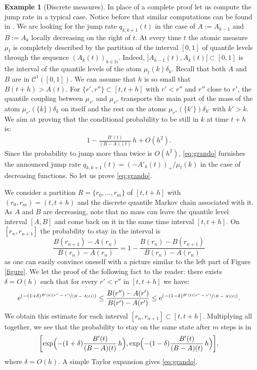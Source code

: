 \documentclass[11pt]{article}
\theoremstyle{plain}
\theoremstyle{definition}
\newtheorem{ex}[them]{Example}
\newcommand{\N}{\mathbb{N}}
\newcommand{\e}{\mathrm{e}}
\begin{document}
\begin{ex}[Discrete measures]
In place of a complete proof let us compute the jump rate in a typical case. Notice before that similar computations can be found in \cite[\S 4]{Ju_ejp}. We are looking for the jump rate $q_{k,k+1}(t)$ in the case of $A:=A_{k-1}$ and $B:=A_k$ locally decreasing on the right of $t$. At every time $t$ the atomic measure $\mu_t$ is completely described by the partition of the interval $[0,1]$ of quantile levels through the sequence $(A_k(t))_{k\in \N}$. Indeed, $]A_{k-1}(t),A_k(t)[\subset [0,1]$ is the interval
of the quantile levels of the atom $\mu_t(k)\delta_k$. Recall that both $A$ and $B$ are in $\mathcal{C}^1([0,1])$. We can assume that $h$ is so small that $B(t+h)>A(t)$. For $\{r',r''\}\subset[t,t+h]$ with $r'<r''$ and $r''$ close to $r'$, the quantile coupling between $\mu_{r'}$ and $\mu_{r''}$ transports the main part of the mass of the atom $\mu_{r'}(\{k\})\delta_k$ on itself and the rest on the atoms $\mu_{r''}(\{k'\})\delta_{k'}$ with $k'>k$. We aim at proving that the conditional probability to be still in $k$ at time $t+h$ is:\vspace*{-3pt}
\begin{align}\label{eq:grando}
1-\frac{B'(t)}{(B-A)(t)}\,h+O(h^2).
\end{align}
Since the probability to jump more than twice is $O(h^2)$, \eqref{eq:grando} furnishes the announced jump rate $q_{k,k+1}(t)=(-A'_k(t))_+/\mu_t(k)$ in the case of decreasing functions. So let us prove \eqref{eq:grando}.

We consider a partition $R=\{r_0,\ldots,r_{m}\}$ of $[t,t+h]$ with $(r_0,r_{m})=(t,t+h)$ and the discrete quantile Markov chain associated with it. As $A$ and $B$ are decreasing, note that no mass can leave the quantile level interval $[A,B]$ and come back on it in the same time interval $[t,t+h]$. On $[r_n,r_{n+1}]$ the probability to stay in the interval is
\[
\frac{B(r_{n+1})-A(r_n)}{B(r_n)-A(r_n)}=1-\frac{B(r_n)-B(r_{n+1})}{B(r_n)-A(r_n)}
\]
as one can easily convince oneself with a picture similar to the left part of Figure \ref{figure}. We let the proof of the following fact to the reader: there exists $\delta=O(h)$ such that for every $r'<r''$ in $[t,t+h]$ we have:
\[\e^{\left(-(1+\delta)\sfrac{B'(t)(r''-r')}{(B-A)(t)}\right)}\leq \frac{B(r'')-A(r')}{B(r')-A(r')}\leq \e^{\left(-(1-\delta)\sfrac{B'(t)(r''-r')}{(B-A)(t)}\right)}.\]
We obtain this estimate for each interval $[r_n,r_{n+1}]\subset [t,t+h]$. Multiplying all together, we see that the probability to stay on the same state after $m$ steps is in
\[
\biggl[\exp\Bigl(-(1+\delta)\frac{B'(t)}{(B-A)(t)}\,h \Bigr),\exp\Bigl(-(1-\delta)\frac{B'(t)}{(B-A)(t)}\,h \Bigr)\biggr],
\]
where $\delta=O(h)$. A simple Taylor expansion gives \eqref{eq:grando}.\end{ex}
\end{document}
